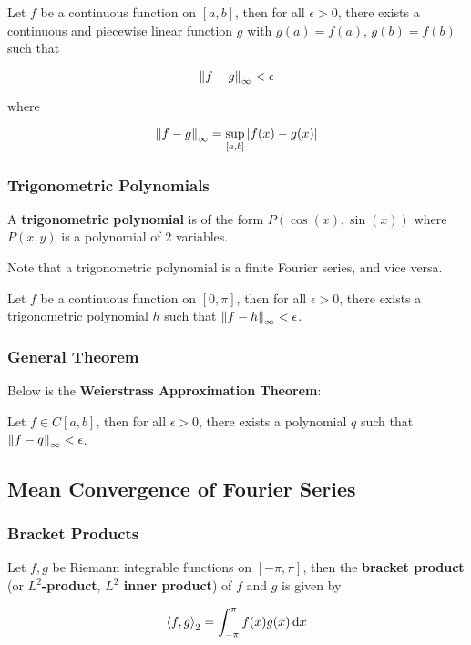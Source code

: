 \documentclass[a4paper,12pt]{article}
\begin{document}
\begin{pst}
  Let $f$ be a continuous function on $[a,b]$, then for all $\epsilon>0$, there exists a continuous and piecewise linear function $g$ with $g(a)=f(a)$, $g(b)=f(b)$ such that

  $$\left\| f-g\right\|_{\infty}<\epsilon$$\s

  where

  $$\left\| f-g\right\|_{\infty}=\sup_{[a,b]}\left| f(x)-g(x)\right|$$
\end{pst}

\subsubsection{Trigonometric Polynomials}
\begin{dft}
  A \textbf{trigonometric polynomial} is of the form $P(\cos(x),\sin(x))$ where $P(x,y)$ is a polynomial of $2$ variables.
\end{dft}\n

Note that a trigonometric polynomial is a finite Fourier series, and vice versa.\n

\begin{pst}
  Let $f$ be a continuous function on $[0,\pi]$, then for all $\epsilon>0$, there exists a trigonometric polynomial $h$ such that $\left\| f-h\right\|_{\infty}<\epsilon$.
\end{pst}

\subsubsection{General Theorem}
Below is the \textbf{Weierstrass Approximation Theorem}:\n

\begin{thm}
  Let $f\in C[a,b]$, then for all $\epsilon>0$, there exists a polynomial $q$ such that $\left\| f-q\right\|_{\infty}<\epsilon$.
\end{thm}

\subsection{Mean Convergence of Fourier Series}
\subsubsection{Bracket Products}
\begin{dft}
  Let $f,g$ be Riemann integrable functions on $[-\pi,\pi]$, then the \textbf{bracket product} (or \textbf{$L^{2}$-product}, \textbf{$L^{2}$ inner product}) of $f$ and $g$ is given by

  $$\left\langle f,g\right\rangle_{2}=\int_{-\pi}^{\pi}f(x)g(x)\,\mathrm{d} x$$
\end{dft}\n
\end{document}
